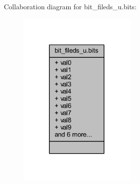 Collaboration diagram for bit\+\_\+fileds\+\_\+u.\+bits\+:
\nopagebreak
\begin{figure}[H]
\begin{center}
\leavevmode
\includegraphics[width=164pt]{d9/d8d/a00262}
\end{center}
\end{figure}
